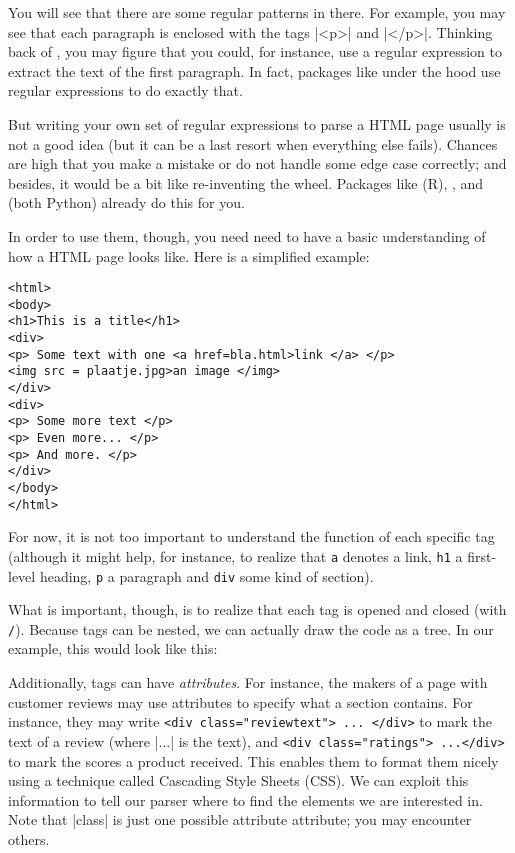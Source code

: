 You will see that there are some regular patterns in there. For
example, you may see that each paragraph is enclosed with the tags
|<p>| and |</p>|. Thinking back of , you may figure
that you could, for instance, use a regular expression to extract
the text of the first paragraph. In fact, packages like 
under the hood use regular expressions to do exactly that.

But writing your own set of regular expressions to parse a HTML
page usually is not a good idea (but it can be a last resort when
everything else fails). Chances are high that you make
a mistake or do not handle some edge case correctly; and besides,
it would be a bit like re-inventing the wheel. Packages like
 (R), , and  (both Python)
already do this for you.

In order to use them, though, you need need to have a basic
understanding of how a HTML page looks like. Here is a simplified
example:

\begin{lstlisting}
<html>
<body>
<h1>This is a title</h1>
<div>
<p> Some text with one <a href=bla.html>link </a> </p>
<img src = plaatje.jpg>an image </img>
</div>
<div>
<p> Some more text </p>
<p> Even more... </p>
<p> And more. </p>
</div>
</body>
</html>
\end{lstlisting}

For now, it is not too important to understand the function of each
specific tag (although it might help, for instance, to realize that
\texttt{a} denotes a link, \texttt{h1} a first-level heading,
\texttt{p} a paragraph and \texttt{div} some kind of section).

What is important, though, is to realize that each tag is opened and
closed (with \texttt{/}). Because tags can be nested, we can actually
draw the code as a tree. In our example, this would look like this:



Additionally, tags can have \emph{attributes}. For instance, the
makers of a page with customer reviews may use attributes to specify
what a section contains. For instance, they may write
\texttt{<div class="reviewtext"> ... </div>}  to mark the text of a review (where
|...| is the text), and \texttt{<div class="ratings"> ...</div>} to mark the
scores a product received. This enables them to format them nicely
using a technique called Cascading Style Sheets (CSS). We can exploit
this information to tell our parser where to find the elements we
are interested in. Note that |class| is just one possible attribute
attribute; you may encounter others.

